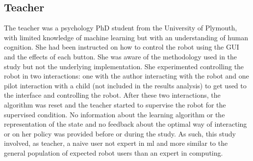 \subsection{Teacher}
The teacher was a psychology PhD student from the University of Plymouth, with limited knowledge of machine learning but with an understanding of human cognition. She had been instructed on how to control the robot using the GUI and the effects of each button. She was aware of the methodology used in the study but not the underlying implementation. She experimented controlling the robot in two interactions: one with the author interacting with the robot and one pilot interaction with a child (not included in the results analysis) to get used to the interface and controlling the robot. After these two interactions, the algorithm was reset and the teacher started to supervise the robot for the supervised condition. No information about the learning algorithm or the representation of the state and no feedback about the optimal way of interacting or on her policy was provided before or during the study. As such, this study involved, as teacher, a naive user not expert in \gls{ml} and more similar to the general population of expected robot users than an expert in computing.




